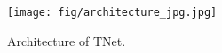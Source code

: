 \documentclass[11pt,a4paper]{article}
\begin{document}
\begin{comment}
\begin{equation}
\begin{split}
\overrightarrow{h}^{(0)}_i &= \overrightarrow{\text{LSTM}}(x_i),i \in [1, n] \\
\overleftarrow{h}^{(0)}_i &= \overleftarrow{\text{LSTM}}(x_i), i \in [1, n] \\
h^{(0)}_i &= [\overrightarrow{h}^{(0)}_i; \overleftarrow{h}^{(0)}_i], i \in [1, n] 
\end{split}.
\end{equation}





    
The computation process of LSTM is below:

\begin{equation}
\label{eq:lstm}
\begin{split}
\begin{bmatrix}
i_t \\
f_t \\
\hat{c}_t \\
o_t
\end{bmatrix}
&=
\begin{bmatrix}
\sigma \\
\sigma \\
\text{tanh} \\
\sigma
\end{bmatrix}
\begin{bmatrix}
W & U & I
\end{bmatrix}
\begin{bmatrix}
x_t \\
h_{t-1}\\
b
\end{bmatrix}, \\
c_t &= i_t \odot \hat{c}_t + c_{t-1} \odot f_t, \\
h_t &= \text{tanh}(c_t) \odot o_t,
\end{split}
\end{equation}
where $W \in \mathbb{R}^{4\mathrm{dim}_h \times \mathrm{dim}_x}$, $U \in \mathbb{R}^{4\mathrm{dim}_h \times \mathrm{dim}_h} $ and $b \in \mathbb{R}^{\mathrm{dim}_h}$ are learnable parameters of LSTM, and $n$ is the length of the input sentence. For simplicity, we denote the above equation as $\mathrm{LSTM}(x_t)$ in the following sections. 

\end{comment}

\begin{figure}[!t]
    \centering
    \texttt{[image: fig/architecture\_jpg.jpg]}
\caption{Architecture of TNet.}
    \label{fig:architecture}
\end{figure}
\end{document}
